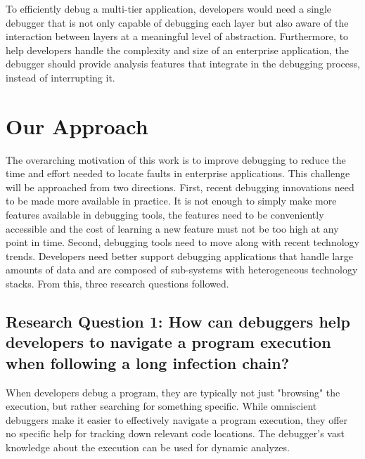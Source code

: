 To efficiently debug a multi-tier application, developers would need a single debugger that is not only capable of debugging each layer but also aware of the interaction between layers at a meaningful level of abstraction.
Furthermore, to help developers handle the complexity and size of an enterprise application, the debugger should provide analysis features that integrate in the debugging process, instead of interrupting it.

\section{Our Approach} %

The overarching motivation of this work is to improve debugging to reduce the time and effort needed to locate faults in enterprise applications.
This challenge will be approached from two directions.
First, recent debugging innovations need to be made more available in practice.
It is not enough to simply make more features available in debugging tools, the features need to be conveniently accessible and the cost of learning a new feature must not be too high at any point in time.
Second, debugging tools need to move along with recent technology trends.
Developers need better support debugging applications that handle large amounts of data and are composed of sub-systems with heterogeneous technology stacks.
From this, three research questions followed.

\newcommand{\RQ}[1]{\subsection*{#1}}

\RQ{Research Question 1: How can debuggers help developers to navigate a program execution when following a long infection chain?}

When developers debug a program, they are typically not just "browsing" the execution, but rather searching for something specific.
While omniscient debuggers make it easier to effectively navigate a program execution, they offer no specific help for tracking down relevant code locations.
The debugger's vast knowledge about the execution can be used for dynamic analyzes.

